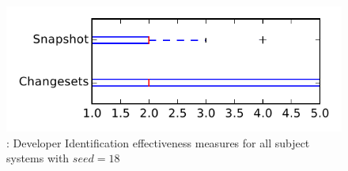 
\begin{figure}
\centering
\includegraphics[height=0.4\textheight]{figures/dit_seed/rq1_tiny_18}
\caption{\rtwo: Developer Identification effectiveness measures for all subject systems with $seed=18$}
\label{fig:dit_seed:rq1:tiny}
\end{figure}

